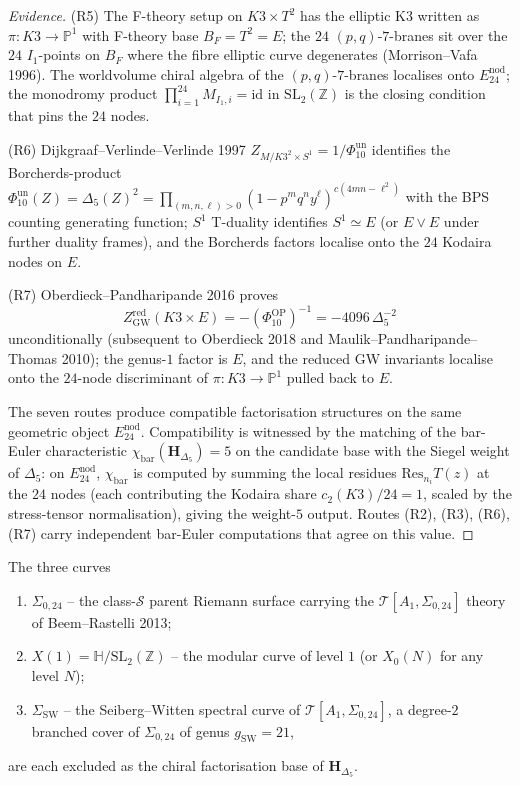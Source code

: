 \begin{proof}[Evidence]
\textup{(R5)} The F-theory setup on $K3\times T^2$ has the elliptic K3
written as $\pi\colon K3\to\mathbb{P}^1$ with F-theory base
$B_F = T^2 = E$; the $24$ $(p,q)$-$7$-branes sit over the $24$
$I_1$-points on $B_F$ where the fibre elliptic curve degenerates
(Morrison--Vafa 1996). The worldvolume chiral algebra of the
$(p,q)$-$7$-branes localises onto $E^{\mathrm{nod}}_{24}$; the
monodromy product $\prod_{i=1}^{24} M_{I_1,i} = \mathrm{id}$ in
$\mathrm{SL}_2(\mathbb{Z})$ is the closing condition that pins the
$24$ nodes.

\textup{(R6)} Dijkgraaf--Verlinde--Verlinde 1997
\(Z_{M/K3^2\times S^1} = 1/\Phi_{10}^{\mathrm{un}}\) identifies the Borcherds-product
\(\Phi_{10}^{\mathrm{un}}(Z) = \Delta_5(Z)^2 =
\prod_{(m,n,\ell)>0}(1 - p^m q^n y^\ell)^{c(4mn-\ell^2)}\)
with the BPS counting generating function; $S^1$ T-duality identifies
$S^1\simeq E$ (or $E\vee E$ under further duality frames), and the
Borcherds factors localise onto the $24$ Kodaira nodes on $E$.

\textup{(R7)} Oberdieck--Pandharipande 2016 proves
\[
Z^{\mathrm{red}}_{\mathrm{GW}}(K3\times E)
=-(\Phi_{10}^{\mathrm{OP}})^{-1}
=-4096\,\Delta_5^{-2}
\]
unconditionally (subsequent to Oberdieck 2018 and
Maulik--Pandharipande--Thomas 2010); the genus-$1$ factor is $E$, and
the reduced GW invariants localise onto the $24$-node discriminant of
$\pi\colon K3\to\mathbb{P}^1$ pulled back to $E$.

The seven routes produce compatible factorisation structures on the same
geometric object $E^{\mathrm{nod}}_{24}$. Compatibility is witnessed by
the matching of the bar-Euler characteristic
$\chi_{\mathrm{bar}}(\mathbf{H}_{\Delta_5}) = 5$ on the candidate base
with the Siegel weight of $\Delta_5$: on $E^{\mathrm{nod}}_{24}$,
$\chi_{\mathrm{bar}}$ is computed by summing the local residues
$\mathrm{Res}_{n_i}T(z)$ at the $24$ nodes (each contributing the
Kodaira share $c_2(K3)/24 = 1$, scaled by the stress-tensor
normalisation), giving the weight-$5$ output. Routes \textup{(R2)},
\textup{(R3)}, \textup{(R6)}, \textup{(R7)} carry independent bar-Euler
computations that agree on this value.
\end{proof}

\begin{theorem}
\label{thm:k3-curve-exclusion-three-competitors}
The three curves
\begin{enumerate}[label=\textup{(\alph*)}, leftmargin=2.6em]
\item $\Sigma_{0,24}$ -- the class-$\mathcal{S}$ parent Riemann surface
 carrying the $\mathcal{T}[A_1,\Sigma_{0,24}]$ theory of
 Beem--Rastelli 2013;
\item $X(1) = \mathbb{H}/\mathrm{SL}_2(\mathbb{Z})$ -- the modular
 curve of level $1$ (or $X_0(N)$ for any level $N$);
\item $\Sigma_{\mathrm{SW}}$ -- the Seiberg--Witten spectral curve of
 $\mathcal{T}[A_1,\Sigma_{0,24}]$, a degree-$2$ branched cover of
 $\Sigma_{0,24}$ of genus $g_{\mathrm{SW}} = 21$,
\end{enumerate}
are each excluded as the chiral factorisation base of
$\mathbf{H}_{\Delta_5}$.
\end{theorem}

